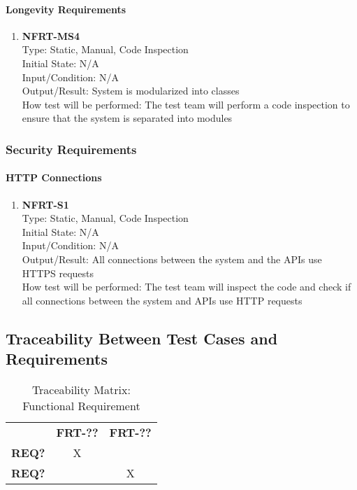 \documentclass[12pt, titlepage]{article}
\begin{document}
\paragraph{Longevity Requirements}
\begin{enumerate}

\item{\textbf{NFRT-MS4}}\\
Type: Static, Manual, Code Inspection\\
Initial State: N/A\\
Input/Condition: N/A\\
Output/Result: System is modularized into classes\\
How test will be performed: The test team will perform a code inspection to ensure that the system is separated into modules
\end{enumerate}

\subsubsection{Security Requirements}
\paragraph{HTTP Connections}
\begin{enumerate}

\item{\textbf{NFRT-S1}}\\
Type: Static, Manual, Code Inspection\\
Initial State: N/A\\
Input/Condition: N/A\\
Output/Result: All connections between the system and the APIs use HTTPS requests\\
How test will be performed: The test team will inspect the code and check if all connections between the system and APIs use HTTP requests
\end{enumerate}

\subsection{Traceability Between Test Cases and Requirements}
\begin{table}[H]
    \centering
    \caption{Traceability Matrix: Functional Requirement}
    \begin{tabular}{lcc}
        ~ & \textbf{FRT-??} & \textbf{FRT-??}\\
        \textbf{REQ?} & X & ~\\
        \textbf{REQ?} & ~ & X\\
    \end{tabular}
    \label{Traceability Matrix: Functional Requirement}
\end{table}
\end{document}
